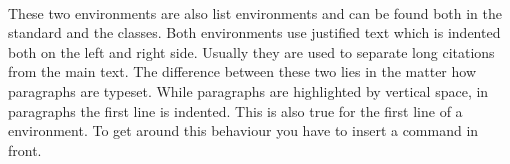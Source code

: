 %
%


\begin{Declaration}
  \\
\end{Declaration}%
%
%
These two environments are also list environments and can be found
both in the standard and the {\KOMAScript} classes. Both environments
use justified text which is indented both on the left and right side.
Usually they are used to separate long citations from
the main text. The difference between these two lies in the matter how
paragraphs are typeset. While  paragraphs are
highlighted by vertical space, in  paragraphs
the first line is indented. This is also true for the first line of a
 environment. To get around this behaviour you
have to insert a  command in front.
